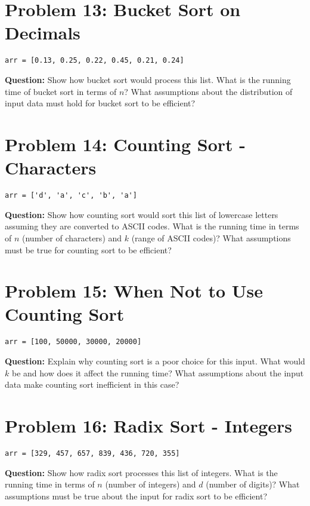 \documentclass[12pt]{article}
\begin{document}
\vspace{2em}

\section*{Problem 13: Bucket Sort on Decimals}
\begin{verbatim}
arr = [0.13, 0.25, 0.22, 0.45, 0.21, 0.24]
\end{verbatim}
\textbf{Question:} Show how bucket sort would process this list. What is the running time of bucket sort in terms of $n$? What assumptions about the distribution of input data must hold for bucket sort to be efficient?

\vspace{2em}

\section*{Problem 14: Counting Sort - Characters}
\begin{verbatim}
arr = ['d', 'a', 'c', 'b', 'a']
\end{verbatim}
\textbf{Question:} Show how counting sort would sort this list of lowercase letters assuming they are converted to ASCII codes. What is the running time in terms of $n$ (number of characters) and $k$ (range of ASCII codes)? What assumptions must be true for counting sort to be efficient?

\vspace{2em}

\section*{Problem 15: When Not to Use Counting Sort}
\begin{verbatim}
arr = [100, 50000, 30000, 20000]
\end{verbatim}
\textbf{Question:} Explain why counting sort is a poor choice for this input. What would $k$ be and how does it affect the running time? What assumptions about the input data make counting sort inefficient in this case?

\vspace{2em}

\section*{Problem 16: Radix Sort - Integers}
\begin{verbatim}
arr = [329, 457, 657, 839, 436, 720, 355]
\end{verbatim}
\textbf{Question:} Show how radix sort processes this list of integers. What is the running time in terms of $n$ (number of integers) and $d$ (number of digits)? What assumptions must be true about the input for radix sort to be efficient?
\end{document}
